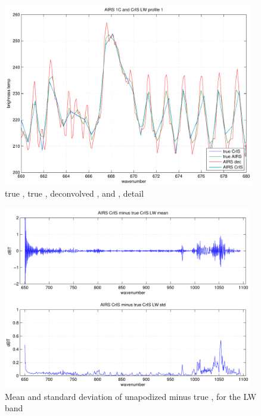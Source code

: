 \documentclass[12pt]{article}
\begin{document}
\begin{figure}
  \centering
  \includegraphics[height=8cm]{figures/airs_cris_zoom_LW_noap.pdf}
  \caption{true {\cris}, true {\airs}, deconvolved {\airs}, and
    {\airs} {\cris}, detail }
  \label{aclwz}
\end{figure}



\begin{figure}
  \centering
  \includegraphics[height=8cm]{figures/airs_cris_diff_LW_noap.pdf}
  \caption{Mean and standard deviation of unapodized {\airs} {\cris}
    minus true {\cris}, for the {\cris} LW band }
  \label{aclwd}
\end{figure}
\end{document}
